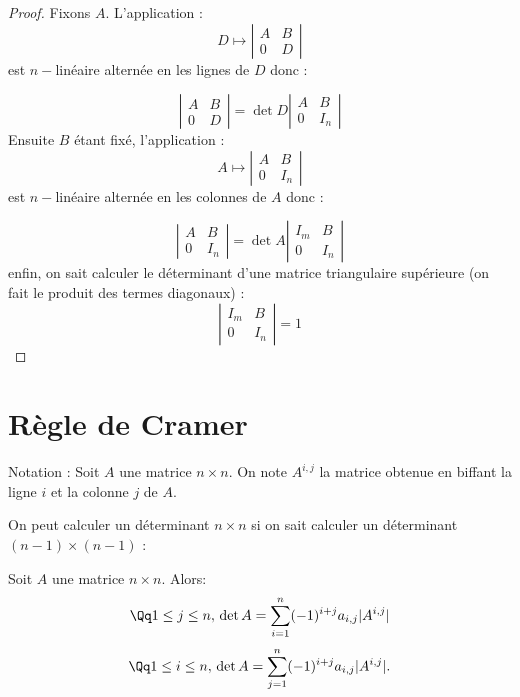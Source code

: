 \documentclass[class=report,crop=false]{standalone}
\begin{document}
\begin{proof}
Fixons $A$. L'application :
\[D \mapsto \left|\begin{array}{c|c}
A & B\\
\hline 
0 & D
\end{array}\right|\]
est $n-$linéaire alternée en les lignes de $D$ donc :

\[\left|\begin{array}{c|c}
A & B\\
\hline 
0 & D
\end{array}\right| = \det D \left|\begin{array}{c|c}
A & B\\
\hline 
0 & I_n 
\end{array}\right| \]
Ensuite $B$ étant fixé, l'application :
\[A \mapsto \left|\begin{array}{c|c}
A & B\\
\hline 
0 & I_n
\end{array}\right| \]
est $n-$linéaire alternée en les colonnes de $A$ donc :

\[\left|\begin{array}{c|c}
A & B\\
\hline 
0 & I_n
\end{array}\right| = \det A \left|\begin{array}{c|c}
I_m & B\\
\hline 
0 & I_n
\end{array}\right| \]
enfin, on sait calculer le déterminant d'une matrice triangulaire supérieure (on fait le produit des termes diagonaux) :
\[\left|\begin{array}{c|c}
I_m & B\\
\hline 
0 & I_n
\end{array}\right|  = 1\]
\end{proof}

\section{Règle de Cramer}

Notation : Soit $A$ une matrice $n \times n$. On note $A^{i,j}$ la matrice obtenue en biffant la ligne $i$ et la colonne $j$ de $A$.


On peut calculer un déterminant $n \times n$ si on sait calculer un déterminant $(n-1) \times (n-1)$ :

\begin{proposition}

Soit $A$ une matrice $n \times n$. Alors: 
\[\Qq 1 \le j \le n, \, \det A = \sum_{i=1}^n (-1)^{i+j}a_{i,j}|A^{i,j}| \]
\[\Qq 1 \le i \le n,\, \det A = \sum_{j=1}^n (-1)^{i+j}a_{i,j}|A^{i,j}| .\]

\end{proposition}
\end{document}
